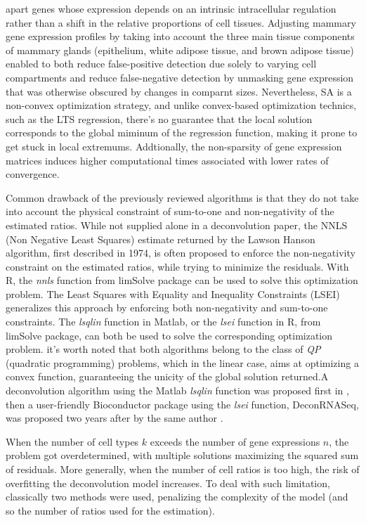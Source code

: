apart genes whose expression depends on an intrinsic intracellular
regulation rather than a shift in the relative proportions of cell
tissues. Adjusting mammary gene expression profiles by taking into
account the three main tissue components of mammary glands (epithelium,
white adipose tissue, and brown adipose tissue) enabled to both reduce
false-positive detection due solely to varying cell compartments and
reduce false-negative detection by unmasking gene expression that was
otherwise obscured by changes in compar$  $nt sizes. Nevertheless, SA is
a non-convex optimization strategy, and unlike convex-based optimization
technics, such as the LTS regression, there's no guarantee that the
local solution corresponds to the global miminum of the regression
function, making it prone to get stuck in local extremums. Addtionally,
the non-sparsity of gene expression matrices induces higher
computational times associated with lower rates of convergence.

Common drawback of the previously reviewed algorithms is that they do
not take into account the physical constraint of sum-to-one and
non-negativity of the estimated ratios. While not supplied alone in a
deconvolution paper, the NNLS (Non Negative Least Squares) estimate
returned by the Lawson Hanson algorithm, first described in 1974, is
often proposed to enforce the non-negativity constraint on the estimated
ratios, while trying to minimize the residuals. With R, the \emph{nnls}
function from limSolve package can be used to solve this optimization
problem. The Least Squares with Equality and Inequality Constraints
(LSEI) generalizes this approach by enforcing both non-negativity and
sum-to-one constraints. The \emph{lsqlin} function in Matlab, or the
\emph{lsei} function in R, from limSolve package, can both be used to
solve the corresponding optimization problem. it's worth noted that both
algorithms belong to the class of \emph{QP} (quadratic programming)
problems, which in the linear case, aims at optimizing a convex
function, guaranteeing the unicity of the global solution returned.A
deconvolution algorithm using the Matlab \emph{lsqlin} function was
proposed first in \autocite{gong_etal11}, then a user-friendly Bioconductor package using the \emph{lsei}
function, DeconRNASeq, was proposed two years after by the same author
\autocite{gong_szustakowski13}.

When the number of cell types \(k\) exceeds the number of gene
expressions \(n\), the problem got overdetermined, with multiple
solutions maximizing the squared sum of residuals. More generally, when
the number of cell ratios is too high, the risk of overfitting the
deconvolution model increases. To deal with such limitation, classically
two methods were used, penalizing the complexity of the model (and so
the number of ratios used for the estimation).

